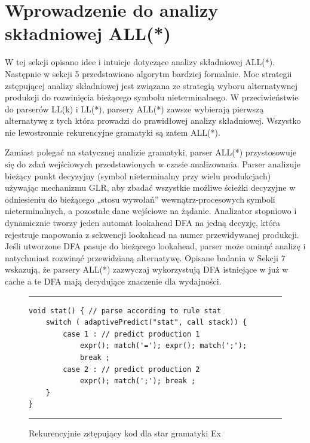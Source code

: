 \section{Wprowadzenie do analizy składniowej ALL(*)}
W tej sekcji opisano idee i intuicje dotyczące analizy składniowej ALL(*).
Następnie w sekcji 5 przedstawiono algorytm bardziej formalnie.
Moc strategii zstępującej analizy składniowej jest związana ze strategią wyboru
alternatywnej produkcji do rozwinięcia bieżącego symbolu nieterminalnego.
W przeciwieństwie do parserów LL(k) i LL(*), parsery ALL(*) zawsze wybierają
pierwszą alternatywę z tych która prowadzi do prawidłowej analizy składniowej.
Wszystko nie lewostronnie rekurencyjne gramatyki są zatem ALL(*).
\par
Zamiast polegać na statycznej analizie gramatyki,
parser ALL(*) przystosowuje się do zdań wejściowych przedstawionych w czasie analizowania.
Parser analizuje bieżący punkt decyzyjny (symbol nieterminalny przy wielu produkcjach)
używając mechanizmu GLR, aby zbadać wszystkie możliwe ścieżki decyzyjne
w odniesieniu do bieżącego „stosu wywołań” wewnątrz-procesowych symboli nieterminalnych,
a pozostałe dane wejściowe na żądanie. Analizator stopniowo i dynamicznie
tworzy jeden automat lookahead DFA na jedną decyzję, która rejestruje mapowania
z sekwencji lookahead na numer przewidywanej produkcji.
Jeśli utworzone DFA pasuje do bieżącego lookahead, parser może ominąć analizę
i natychmiast rozwinąć przewidzianą alternatywę.
Opisane badania w Sekcji 7 wskazują, że parsery ALL(*) zazwyczaj wykorzystują
DFA istniejące w już w cache a te DFA mają decydujące znaczenie dla wydajności. 

\begin{figure}[!ht]
\noindent\rule{\linewidth}{0.3pt}
\begin{lstlisting}
void stat() { // parse according to rule stat
	switch ( adaptivePredict("stat", call stack)) {
		case 1 : // predict production 1
			expr(); match('='); expr(); match(';');
			break ;
		case 2 : // predict production 2
			expr(); match(';'); break ;
	}
}
\end{lstlisting}
\noindent\rule{\linewidth}{0.3pt}
\caption{Rekurencyjnie zstępujący kod dla star gramatyki Ex}
\end{figure}


